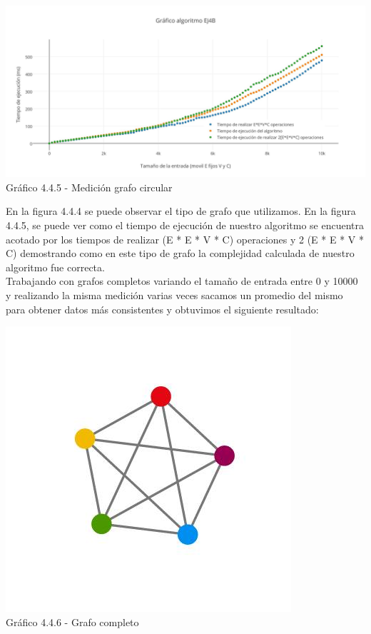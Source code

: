   \vspace*{0.3cm} \vspace*{0.3cm}
  \begin{center}
 \includegraphics[scale=0.28]{./ej4/circular2b.jpg}
 	{Gráfico 4.4.5 - Medición grafo circular}
  \end{center}
  \vspace*{0.3cm}


En la figura 4.4.4 se puede observar el tipo de grafo que utilizamos. En la figura 4.4.5, se puede ver como el tiempo de ejecución de nuestro algoritmo se encuentra acotado por los tiempos de realizar (E * E * V * C)  operaciones y 2 (E * E * V * C)  demostrando como en este tipo de grafo la complejidad calculada de nuestro algoritmo fue correcta.\\


Trabajando con grafos completos variando el tamaño de entrada entre 0 y 10000 y realizando la misma medición varias veces sacamos un promedio del mismo para obtener datos más consistentes y obtuvimos el siguiente resultado:

\vspace*{0.3cm} \vspace*{0.3cm}
  \begin{center}
 \includegraphics[scale=0.5]{./ej4/completo.jpg}
 	{\\Gráfico 4.4.6 - Grafo completo}
  \end{center}
  \vspace*{0.3cm}
  
